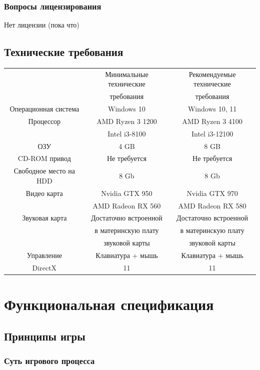 \documentclass{article}
\begin{document}
\subsubsection{Вопросы лицензирования}

Нет лицензии (пока что)

\subsection{Технические требования}
\begin{center}
\begin{tabular}{ c | c | c }
 & Минимальные технические & Рекомендуемые технические \\ 
 & требования & требования \\ [2ex]
 Операционная система & Windows 10 & Windows 10, 11 \\ [2ex] 
 Процессор & AMD Ryzen 3 1200 & AMD Ryzen 3 4100 \\  
 & Intel i3-8100 & Intel i3-12100 \\ [2ex]
 ОЗУ & 4 GB & 8 GB \\ [2ex]
 CD-ROM привод & Не требуется & Не требуется \\ [2ex]
 Свободное место на HDD & 8 Gb & 8 Gb \\ [2ex]
 Видео карта & Nvidia GTX 950 & Nvidia GTX 970 \\
 & AMD Radeon RX 560 & AMD Radeon RX 580 \\ [2ex]
 Звуковая карта & Достаточно встроенной & Достаточно встроенной \\
 & в материнскую плату & в материнскую плату \\
 & звуковой карты & звуковой карты \\ [2ex]
 Управление & Клавиатура + мышь & Клавиатура + мышь \\ [2ex]
 DirectX & 11 & 11 \\
\end{tabular}
\end{center}

\section{Функциональная спецификация}

\subsection{Принципы игры}

\subsubsection{Суть игрового процесса}
\end{document}
